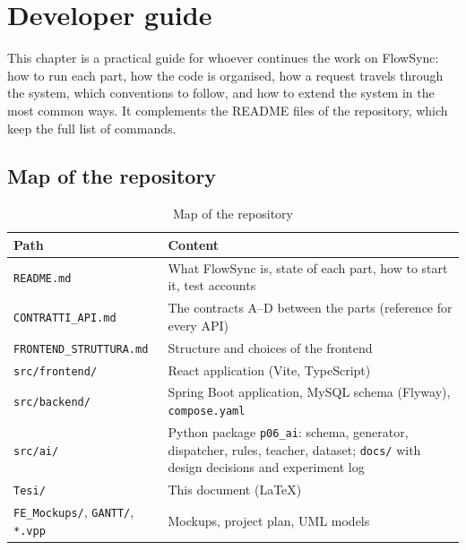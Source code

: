\chapter{Developer guide}
\label{chap:dev-guide}
\sloppy

This chapter is a practical guide for whoever continues the work on FlowSync: how to run each
part, how the code is organised, how a request travels through the system, which conventions to
follow, and how to extend the system in the most common ways. It complements the README files of
the repository, which keep the full list of commands.


\lstset{basicstyle=\ttfamily\footnotesize, columns=fullflexible, keepspaces=true, frame=single,
        breaklines=true, xleftmargin=2pt, xrightmargin=2pt}

\section{Map of the repository}
\label{sec:dev-map}

\begin{table}[htpb]
  \centering
  \small
  \begin{tabular}{@{}p{4.4cm}p{9.4cm}@{}}
    \toprule
    \textbf{Path} & \textbf{Content} \\
    \midrule
    \texttt{README.md} & What FlowSync is, state of each part, how to start it, test accounts \\
    \texttt{CONTRATTI\_API.md} & The contracts A--D between the parts (reference for every API) \\
    \texttt{FRONTEND\_STRUTTURA.md} & Structure and choices of the frontend \\
    \texttt{src/frontend/} & React application (Vite, TypeScript) \\
    \texttt{src/backend/} & Spring Boot application, MySQL schema (Flyway), \texttt{compose.yaml} \\
    \texttt{src/ai/} & Python package \texttt{p06\_ai}: schema, generator, dispatcher, rules,
      teacher, dataset; \texttt{docs/} with design decisions and experiment log \\
    \texttt{Tesi/} & This document (LaTeX) \\
    \texttt{FE\_Mockups/}, \texttt{GANTT/}, \texttt{*.vpp} & Mockups, project plan, UML models \\
    \bottomrule
  \end{tabular}
  \caption{Map of the repository}
  \label{tab:repo-map}
\end{table}

